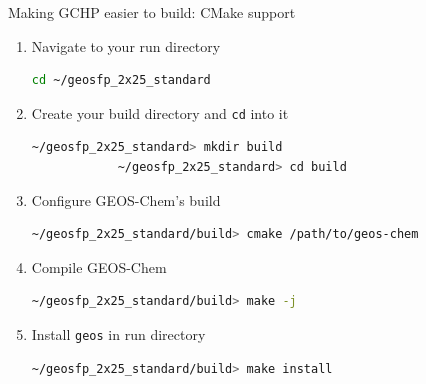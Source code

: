 \documentclass[10pt]{beamer}
\begin{document}
\begin{frame}[fragile]{Making GCHP easier to build: CMake support}
    \begin{minipage}[c]{0.6\textwidth}
        \footnotesize
        \begin{enumerate}
            \item Navigate to your run directory
            \begin{lstlisting}[language=bash,morekeywords={mkdir,cmake,make},]
            cd ~/geosfp_2x25_standard
            \end{lstlisting}
            \item Create your build directory and \texttt{cd} into it
            \begin{lstlisting}[language=bash,morekeywords={mkdir,cmake,make},]
            ~/geosfp_2x25_standard> mkdir build
            ~/geosfp_2x25_standard> cd build
            \end{lstlisting}
            \item Configure GEOS-Chem's build
            \begin{lstlisting}[language=bash,morekeywords={mkdir,cmake,make},]
            ~/geosfp_2x25_standard/build> cmake /path/to/geos-chem
            \end{lstlisting}
            \item Compile GEOS-Chem
            \begin{lstlisting}[language=bash,morekeywords={mkdir,cmake,make},]
            ~/geosfp_2x25_standard/build> make -j
            \end{lstlisting}
            \item Install \texttt{geos} in run directory
            \begin{lstlisting}[language=bash,morekeywords={mkdir,cmake,make},]
            ~/geosfp_2x25_standard/build> make install
            \end{lstlisting}
        \end{enumerate}


\end{minipage}
\end{frame}
\end{document}
